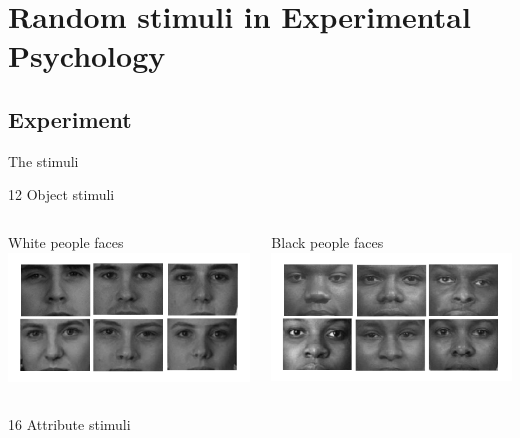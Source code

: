 \documentclass[compress]{beamer}
\begin{document}
\section{Random stimuli in Experimental Psychology}

\subsection{Experiment}
\begin{frame}{The stimuli}

	
	\begin{block}{12 Object stimuli}
	\begin{columns}
		\centering
			White people faces
		\includegraphics[width=\linewidth]{img/white.png}
		
		\centering
			Black people faces
		\includegraphics[width=\linewidth]{img/black.png}
	\end{columns}		
	\end{block}
	

	
	\begin{block}{16 Attribute stimuli}
		

\end{block}
\end{frame}
\end{document}
